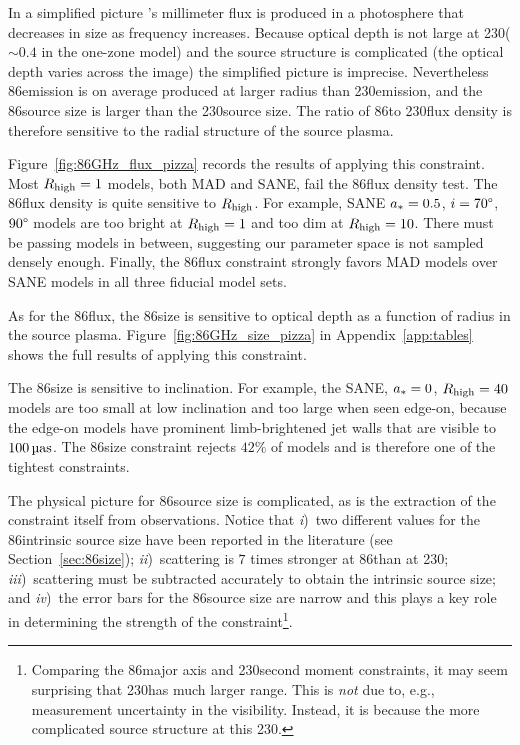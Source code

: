 
In a simplified picture \sgra's millimeter flux is produced in a photosphere that decreases in size as frequency increases.
Because optical depth is not large at 230\GHz ($\sim 0.4$ in the one-zone model) and the source structure is complicated (the optical depth varies across the image) the simplified picture is imprecise.
Nevertheless 86\GHz emission is on average produced at larger radius than 230\GHz emission, and the 86\GHz source size is larger than the 230\GHz source size.  The ratio of 86\GHz to 230\GHz flux density is therefore sensitive to the radial structure of the source plasma.

Figure~\ref{fig:86GHz_flux_pizza} records the results of applying this constraint.
Most $R_\mathrm{high} = 1$ models, both MAD and SANE, fail the 86\GHz flux density test.
The 86\GHz flux density is quite sensitive to $R_\mathrm{high}$.
For example, SANE $a_* = 0.5$, $i = 70\degree$, $90\degree$ models are too bright at $R_\mathrm{high} = 1$ and too dim at $R_\mathrm{high} = 10$.
There must be passing models in between, suggesting our parameter space is not sampled densely enough.
Finally, the 86\GHz flux constraint strongly favors MAD models over SANE models in all three fiducial model sets.


As for the 86\GHz flux, the 86\GHz size is sensitive to optical depth as a function of radius in the source plasma.
Figure~\ref{fig:86GHz_size_pizza} in Appendix~\ref{app:tables} shows the full results of applying this constraint.

The 86\GHz size is sensitive to inclination.
For example, the SANE, $a_* = 0$, $R_\mathrm{high} = 40$ models are too small at low inclination and too large when seen edge-on, because the edge-on models have prominent limb-brightened jet walls that are visible to $100\uas$.
The 86\GHz size constraint rejects $42\%$ of models and is therefore one of the tightest constraints.

The physical picture for 86\GHz source size is complicated, as is the extraction of the constraint itself from observations.
Notice that
\emph{i})~two different values for the 86\GHz intrinsic source size have been reported in the literature (see Section~\ref{sec:86size});
\emph{ii})~scattering is $7$ times stronger at 86\GHz than at 230\GHz;
\emph{iii})~scattering must be subtracted accurately to obtain the intrinsic source size; and
\emph{iv})~the error bars for the 86\GHz source size are narrow and this plays a key role in determining the strength of the constraint\footnote{Comparing the 86\GHz major axis and 230\GHz second moment constraints, it may seem surprising that 230\GHz has much larger range.
This is \emph{not} due to, e.g., measurement uncertainty in the visibility.
Instead, it is because the more complicated source structure at this 230\GHz.}.

